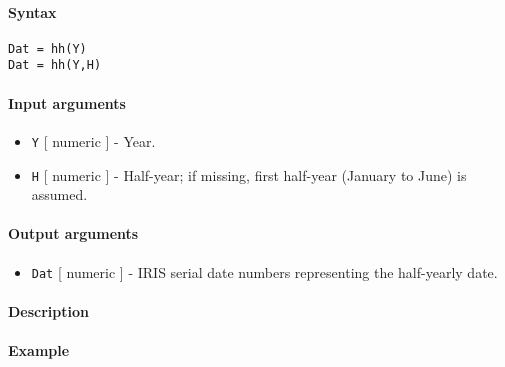 


	\paragraph{Syntax}

\begin{verbatim}
Dat = hh(Y)
Dat = hh(Y,H)
\end{verbatim}

\paragraph{Input arguments}

\begin{itemize}
\item
  \texttt{Y} {[} numeric {]} - Year.
\item
  \texttt{H} {[} numeric {]} - Half-year; if missing, first half-year
  (January to June) is assumed.
\end{itemize}

\paragraph{Output arguments}

\begin{itemize}
\itemsep1pt\parskip0pt
\item
  \texttt{Dat} {[} numeric {]} - IRIS serial date numbers representing
  the half-yearly date.
\end{itemize}

\paragraph{Description}

\paragraph{Example}


